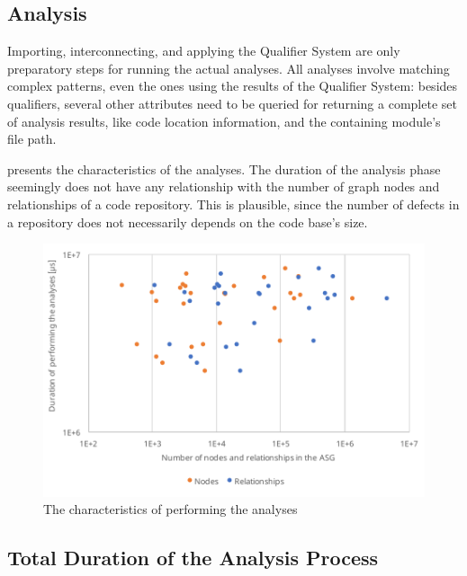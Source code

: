 \subsection{Analysis}

Importing, interconnecting, and applying the Qualifier System are only preparatory steps for running the actual analyses. All analyses involve matching complex patterns, even the ones using the results of the Qualifier System: besides qualifiers, several other attributes need to be queried for returning a complete set of analysis results, like code location information, and the containing module's file path.

 presents the characteristics of the analyses. The duration of the analysis phase seemingly does not have any relationship with the number of graph nodes and relationships of a code repository. This is plausible, since the number of defects in a repository does not necessarily depends on the code base's size.

\vspace*{-2mm}
\begin{figure}[!htb]
	\centerfloat
	\includegraphics[width=\textwidth,clip]{figures/measurement-analysis-nodes-relationships.pdf}
	\caption{The characteristics of performing the analyses}
	\label{fig:measurement-analysis-nodes-relationships}
\end{figure}
\vspace*{-2mm}

\subsection{Total Duration of the Analysis Process}

